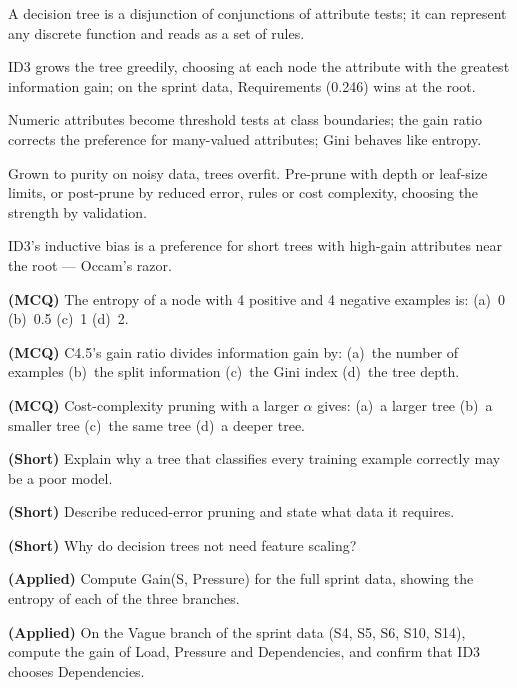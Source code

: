 \begin{chaptersummary}
\begin{tight}
  \item A decision tree is a disjunction of conjunctions of attribute tests; it
        can represent any discrete function and reads as a set of rules.
  \item ID3 grows the tree greedily, choosing at each node the attribute with the
        greatest information gain; on the sprint data, Requirements (0.246) wins
        at the root.
  \item Numeric attributes become threshold tests at class boundaries; the gain
        ratio corrects the preference for many-valued attributes; Gini behaves
        like entropy.
  \item Grown to purity on noisy data, trees overfit. Pre-prune with depth or
        leaf-size limits, or post-prune by reduced error, rules or cost
        complexity, choosing the strength by validation.
  \item ID3's inductive bias is a preference for short trees with high-gain
        attributes near the root --- Occam's razor.
\end{tight}
\end{chaptersummary}

\begin{reviewq}
  \item \textbf{(MCQ)} The entropy of a node with 4 positive and 4 negative
        examples is: (a)~0 (b)~0.5 (c)~1 (d)~2.
  \item \textbf{(MCQ)} C4.5's gain ratio divides information gain by: (a)~the
        number of examples (b)~the split information (c)~the Gini index (d)~the
        tree depth.
  \item \textbf{(MCQ)} Cost-complexity pruning with a larger $\alpha$ gives:
        (a)~a larger tree (b)~a smaller tree (c)~the same tree (d)~a deeper tree.
  \item \textbf{(Short)} Explain why a tree that classifies every training example
        correctly may be a poor model.
  \item \textbf{(Short)} Describe reduced-error pruning and state what data it
        requires.
  \item \textbf{(Short)} Why do decision trees not need feature scaling?
  \item \textbf{(Applied)} Compute Gain(S, Pressure) for the full sprint data,
        showing the entropy of each of the three branches.
  \item \textbf{(Applied)} On the Vague branch of the sprint data (S4, S5, S6,
        S10, S14), compute the gain of Load, Pressure and Dependencies, and
        confirm that ID3 chooses Dependencies.
\end{reviewq}
